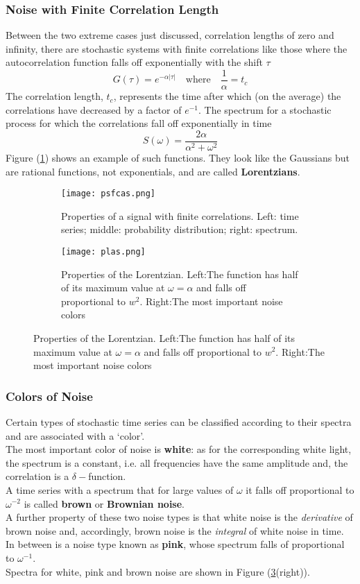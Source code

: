 \subsubsection{Noise with Finite Correlation Length}
Between the two extreme cases just discussed, correlation lengths of zero and infinity, there are stochastic systems with finite correlations like those where the autocorrelation function falls off exponentially with the shift $\tau$
\begin{equation}
	G(\tau)=e^{-\alpha|\tau|}\quad\text{where}\quad\frac{1}{\alpha}=t_c
\end{equation}
The correlation length, $t_c$, represents the time after which (on the average) the correlations have decreased by a factor of $e^{-1}$.
The spectrum for a stochastic process for which the correlations fall off exponentially in time
\begin{equation}
	S(\omega)=\frac{2\alpha}{\alpha^2+\omega^2}
\end{equation}
Figure (\ref{fig:psfcas}) shows an example of such functions.
They look like the Gaussians but are rational functions, not exponentials, and are called \textbf{Lorentzians}.
\begin{figure}[h!]
	\centering
	\begin{subfigure}{0.5\linewidth}
		\centering
		\texttt{[image: psfcas.png]}
		\caption{Properties of a signal with finite correlations. Left: time series; middle: probability distribution; right: spectrum.}
		\label{fig:psfcas}
	\end{subfigure}
	\vline
	\begin{subfigure}{0.43\linewidth}
		\centering
		\texttt{[image: plas.png]}
		\caption{Properties of the Lorentzian. Left:The function has half of its maximum value at $\omega=\alpha$ and falls off proportional to $w^2$. Right:The most important noise colors}
		\label{fig:plas}
	\end{subfigure}
\end{figure}
\subsubsection{Colors of Noise}
Certain types of stochastic time series can be classified according to their spectra and are associated with a ‘color’.\\
The most important color of noise is \textbf{white}: as for the corresponding white light, the spectrum is a constant, i.e. all frequencies have the same amplitude and, the correlation is a $\delta-$function.\\
A time series with a spectrum that for large values of $\omega$ it falls off proportional to $\omega^{-2}$ is called \textbf{brown} or \textbf{Brownian noise}.\\
A further property of these two noise types is that white noise is the \emph{derivative} of brown noise and, accordingly, brown noise is the \emph{integral} of white noise in time.\\
In between is a noise type known as \textbf{pink}, whose spectrum falls of proportional to $\omega^{-1}$.\\
Spectra for white, pink and brown noise are shown in Figure (\ref{fig:plas}(right)).